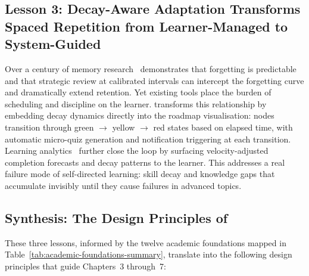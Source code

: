 \subsection*{Lesson 3: Decay-Aware Adaptation Transforms Spaced Repetition from Learner-Managed to System-Guided}

Over a century of memory research~\cite{ebbinghaus1885, cepEDA2006, karpicke2008} demonstrates that forgetting is predictable and that strategic review at calibrated intervals can intercept the forgetting curve and dramatically extend retention. Yet existing tools place the burden of scheduling and discipline on the learner. \projectname{} transforms this relationship by embedding decay dynamics directly into the roadmap visualisation: nodes transition through green \(\rightarrow\) yellow \(\rightarrow\) red states based on elapsed time, with automatic micro-quiz generation and notification triggering at each transition. Learning analytics~\cite{siemens2011, verbert2012} further close the loop by surfacing velocity-adjusted completion forecasts and decay patterns to the learner. This addresses a real failure mode of self-directed learning: skill decay and knowledge gaps that accumulate invisibly until they cause failures in advanced topics.

\subsection*{Synthesis: The Design Principles of \projectname}

These three lessons, informed by the twelve academic foundations mapped in Table~\ref{tab:academic-foundations-summary}, translate into the following design principles that guide Chapters~3 through~7:

